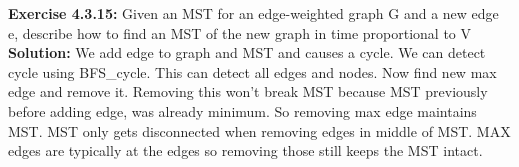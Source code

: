 \documentclass[11pt,fleqn]{article}
\begin{document}
\textbf{Exercise 4.3.15:} Given an MST for an edge-weighted graph G and a new edge e, describe how to
find an MST of the new graph in time proportional to V\\

\textbf{Solution:} We add edge to graph and MST and causes a cycle. We can detect cycle using BFS\_cycle. This can detect all edges and nodes. Now find new max edge and remove it. Removing this won't break MST because MST previously before adding edge, was already minimum. So removing max edge maintains MST. MST only gets disconnected when removing edges in middle of MST. MAX edges are typically at the edges so removing those still keeps the MST intact.


	
\end{document}
